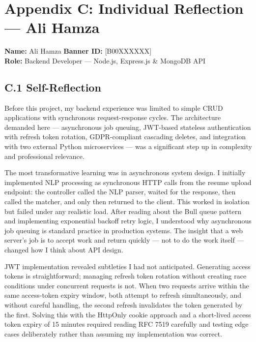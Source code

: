 \chapter*{Appendix C: Individual Reflection --- Ali Hamza}
\textbf{Name:} Ali Hamza \hfill \textbf{Banner ID:} [B00XXXXXX] \\[4pt]
\textbf{Role:} Backend Developer --- Node.js, Express.js \& MongoDB API
\vspace{1em}

\section*{C.1 Self-Reflection}

Before this project, my backend experience was limited to simple CRUD applications with synchronous request-response cycles. The architecture demanded here --- asynchronous job queuing, JWT-based stateless authentication with refresh token rotation, GDPR-compliant cascading deletes, and integration with two external Python microservices --- was a significant step up in complexity and professional relevance.

The most transformative learning was in asynchronous system design. I initially implemented NLP processing as synchronous HTTP calls from the resume upload endpoint: the controller called the NLP parser, waited for the response, then called the matcher, and only then returned to the client. This worked in isolation but failed under any realistic load. After reading about the Bull queue pattern and implementing exponential backoff retry logic, I understood why asynchronous job queuing is standard practice in production systems. The insight that a web server's job is to accept work and return quickly --- not to do the work itself --- changed how I think about API design.

JWT implementation revealed subtleties I had not anticipated. Generating access tokens is straightforward; managing refresh token rotation without creating race conditions under concurrent requests is not. When two requests arrive within the same access-token expiry window, both attempt to refresh simultaneously, and without careful handling, the second refresh invalidates the token generated by the first. Solving this with the HttpOnly cookie approach and a short-lived access token expiry of 15 minutes required reading RFC 7519 carefully and testing edge cases deliberately rather than assuming my implementation was correct.

